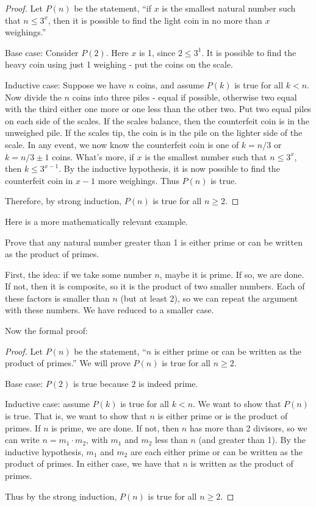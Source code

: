 \documentclass[12pt]{article}
\begin{document}
\begin{proof}
	Let $P(n)$ be the statement, ``if $x$ is the smallest natural number such that $n \le 3^x$, then it is possible to find the light coin in no more than $x$ weighings.''  
	
	Base case: Consider $P(2)$.  Here $x$ is 1, since $2 \le 3^1$.  It is possible to find the heavy coin using just 1 weighing - put the coins on the scale.
	
	Inductive case: Suppose we have $n$ coins, and assume $P(k)$ is true for all $k < n$.  Now divide the $n$ coins into three piles - equal if possible, otherwise two equal with the third either one more or one less than the other two.  Put two equal piles on each side of the scales.  If the scales balance, then the counterfeit coin is in the unweighed pile.  If the scales tip, the coin is in the pile on the lighter side of the scale.  In any event, we now know the counterfeit coin is one of $k = n/3$ or $k = n/3\pm 1$ coins.  What's more, if $x$ is the smallest number such that $n \le 3^x$, then $k \le 3^{x-1}$.  By the inductive hypothesis, it is now possible to find the counterfeit coin in $x-1$ more weighings.  Thus $P(n)$ is true.
	
	Therefore, by strong induction, $P(n)$ is true for all $n \ge 2$.
\end{proof}

Here is a more mathematically relevant example.

\begin{example}
	Prove that any natural number greater than 1 is either prime or can be written as the product of primes.
	\begin{solution}
		First, the idea: if we take some number $n$, maybe it is prime.  If so, we are done.  If not, then it is composite, so it is the product of two smaller numbers.  Each of these factors is smaller than $n$ (but at least 2), so we can repeat the argument with these numbers.  We have reduced to a smaller case.
		
		Now the formal proof:
		\begin{proof}
			Let $P(n)$ be the statement, ``$n$ is either prime or can be written as the product of primes.''  We will prove $P(n)$ is true for all $n \ge 2$. 
			
			Base case: $P(2)$ is true because $2$ is indeed prime.
			
			Inductive case: assume $P(k)$ is true for all $k < n$.  We want to show that $P(n)$ is true.  That is, we want to show that $n$ is either prime or is the product of primes.  If $n$ is prime, we are done.  If not, then $n$ has more than 2 divisors, so we can write $n = m_1 \cdot m_2$, with $m_1$ and $m_2$ less than $n$ (and greater than 1).  By the inductive hypothesis, $m_1$ and $m_2$ are each either prime or can be written as the product of primes.  In either case, we have that $n$ is written as the product of primes.
			
			Thus by the strong induction, $P(n)$ is true for all $n \ge 2$. 		
		\end{proof} 
	\end{solution}
\end{example}
\end{document}
